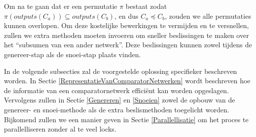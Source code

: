 \documentclass{article}
\begin{document}
Om na te gaan dat er een permutatie $\pi$ bestaat zodat ${\pi\left(outputs\left(C_{a}\right)\right) \subseteq outputs\left(C_{b}\right)}$, en dus $C_a \preceq C_{b}$, zouden we alle permutaties kunnen overlopen.
Om deze kostelijke bewerkingen te vermijden en te versnellen, zullen we extra methoden moeten invoeren om sneller beslissingen te maken over het ``subsumen van een ander netwerk''. 
Deze beslissingen kunnen zowel tijdens de genereer-stap als de snoei-stap plaats vinden.

In de volgende subsecties zal de voorgestelde oplossing specifieker beschreven worden.
In Sectie \ref{RepresentatieVanComparatorNetwerken} wordt beschreven hoe de informatie van een comparatornetwerk effici\"ent kan worden opgeslagen.
Vervolgens zullen in Sectie \ref{Genereren} en \ref{Snoeien} zowel de opbouw van de genereer- en snoei-methode als de extra beslismethoden toegelicht worden.
Bijkomend zullen we een manier geven in Sectie \ref{Parallellisatie} om het proces te parallelliseren zonder al te veel locks.
\end{document}
